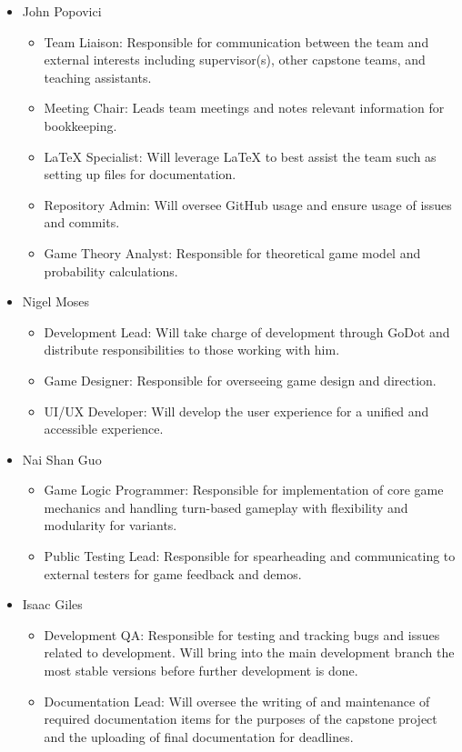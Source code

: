 \documentclass{article}
\begin{document}
\begin{itemize}
	\item John Popovici
	\begin{itemize}
		\item Team Liaison: Responsible for communication between the team and external interests including supervisor(s), other capstone teams, and teaching assistants.
		\item Meeting Chair: Leads team meetings and notes relevant information for bookkeeping.
		\item LaTeX Specialist: Will leverage LaTeX to best assist the team such as setting up files for documentation.
		\item Repository Admin: Will oversee GitHub usage and ensure usage of issues and commits.
		\item Game Theory Analyst: Responsible for theoretical game model and probability calculations. 
	\end{itemize}	
	
	\item Nigel Moses
	\begin{itemize}
		\item Development Lead: Will take charge of development through GoDot and distribute responsibilities to those working with him.
		\item Game Designer: Responsible for overseeing game design and direction.
		\item UI/UX Developer: Will develop the user experience for a unified and accessible experience.
	\end{itemize}	
	
	\item Nai Shan Guo
	\begin{itemize}
		\item Game Logic Programmer: Responsible for implementation of core game mechanics and handling turn-based gameplay with flexibility and modularity for variants.
		\item Public Testing Lead: Responsible for spearheading and communicating to external testers for game feedback and demos.
	\end{itemize}	
	
	\item Isaac Giles
	\begin{itemize}
		\item Development QA: Responsible for testing and tracking bugs and issues related to development. Will bring into the main development branch the most stable versions before further development is done.
		\item Documentation Lead: Will oversee the writing of and maintenance of required documentation items for the purposes of the capstone project and the uploading of final documentation for deadlines.
	\end{itemize}	
	

\end{itemize}
\end{document}
